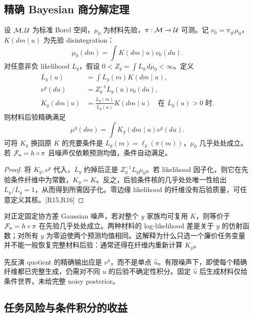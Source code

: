 \subsection{精确 Bayesian 商分解定理}

\begin{theorem}[何时可复用原先验条件核]
设 $\mathcal M,\mathcal U$ 为标准 Borel 空间，$\mu_0$ 为材料先验，$\pi:\mathcal M\to\mathcal U$ 可测。记 $\nu_0=\pi_\#\mu_0$，$K(dm\mid u)$ 为先验 disintegration：
\begin{equation}
\mu_0(dm)=\int K(dm\mid u)\nu_0(du).
\end{equation}
对任意非负 likelihood $L_y$，假设 $0<Z_y=\int L_y\,d\mu_0<\infty$。定义
\begin{align}
\overline L_y(u)&=\int L_y(m)K(dm\mid u),\\
\nu^y(du)&=Z_y^{-1}\overline L_y(u)\nu_0(du),\\
K_y(dm\mid u)&=\frac{L_y(m)}{\overline L_y(u)}K(dm\mid u)
\quad\text{在 }\overline L_y(u)>0\text{ 时}.
\end{align}
则材料后验精确满足
\begin{equation}
\mu^y(dm)=\int K_y(dm\mid u)\nu^y(du).
\end{equation}
可将 $K_y$ 换回原 $K$ 的充要条件是 $L_y(m)=\ell_y(\pi(m))$，$\mu_0$ 几乎处处成立。若 ${\mathcal F_a}=h\circ\pi$ 且噪声仅依赖预测均值，条件自动满足。
\end{theorem}
\begin{proof}
将 $K_y,\nu^y$ 代入，$\overline L_y$ 约掉后正是 $Z_y^{-1}L_y\mu_0$。若 likelihood 因子化，则它在先验条件纤维中为常数，$K_y=K$。反之，后验条件核的几乎处处唯一性给出 $L_y/\overline L_y=1$，从而得到所需因子化。零边缘 likelihood 的纤维没有后验质量，可任意定义其核。[R15,R16]
\end{proof}

对正定固定协方差 Gaussian 噪声，若对整个 $y$ 家族均可复用 $K$，则等价于 ${\mathcal F_a}=h\circ\pi$ 在先验几乎处处成立。两种材料的 log-likelihood 差是关于 $y$ 的仿射函数；对所有 $y$ 为零迫使两个预测均值相同。这解释为什么只选一个廉价任务变量并不能一般恢复完整材料后验：通常还得在纤维内重新计算 $K_y$。

先反演 quotient 的精确输出应是 $\nu^y$，而不是单点 $\widehat u$。有限噪声下，即使每个精确纤维都已完整生成，仍需对不同 $u$ 的后验不确定性积分。固定 $\widehat u$ 后生成材料仅给条件世界，未给完整 noisy posterior。

\subsection{任务风险与条件积分的收益}

